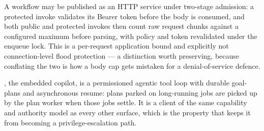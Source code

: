 A workflow may be published as an HTTP service under two-stage admission: a
protected invoke validates its Bearer token before the body is consumed, and both
public and protected invokes then count raw request chunks against a configured
maximum before parsing, with policy and token revalidated under the enqueue lock.
This is a per-request application bound and explicitly not
connection-level flood protection --- a distinction worth preserving, because
conflating the two is how a body cap gets mistaken for a denial-of-service defence.

\aria{}, the embedded copilot, is a permissioned agentic tool loop with durable
goal-plans and asynchronous resume: plans parked on long-running jobs are picked up
by the plan worker when those jobs settle. It is a client of the same capability
and authority model as every other surface, which is the property that keeps it
from becoming a privilege-escalation path.
